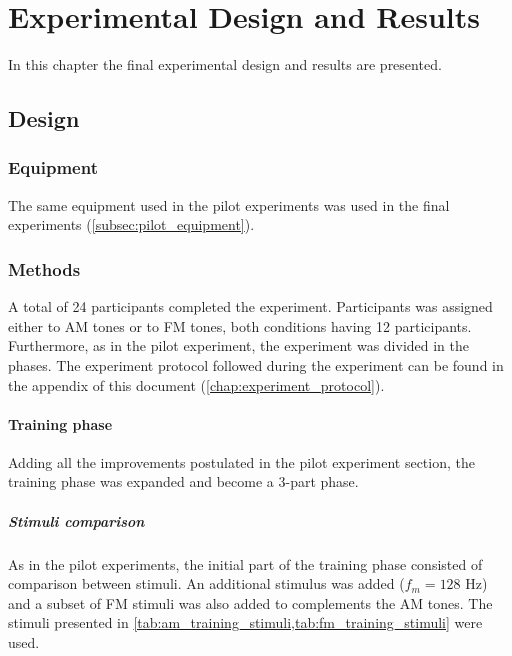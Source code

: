 \documentclass[../main.tex]{subfiles}
\begin{document}
\chapter{Experimental Design and Results}

In this chapter the final experimental design and results are presented.

\section{Design}

\subsection{Equipment}

The same equipment used in the pilot experiments was used in the final
experiments (\ref{subsec:pilot_equipment}).

\subsection{Methods}

A total of 24 participants completed the experiment. Participants was assigned
either to \gls{AM} tones or to \gls{FM} tones, both conditions having 12
participants. Furthermore, as in the pilot experiment, the experiment was
divided in the phases. The experiment protocol followed during the experiment
can be found in the appendix of this document (\ref{chap:experiment_protocol}).

\subsubsection{Training phase}

Adding all the improvements postulated in the pilot experiment section, the
training phase was expanded and become a 3-part phase.

\paragraph{Stimuli comparison}

As in the pilot experiments, the initial part of the training phase consisted
of comparison between stimuli. An additional stimulus was added ($f_m = 128$ Hz)
and a subset of \gls{FM} stimuli was also added to complements the \gls{AM}
tones. The stimuli presented in
\cref{tab:am_training_stimuli,tab:fm_training_stimuli} were used.
\end{document}

